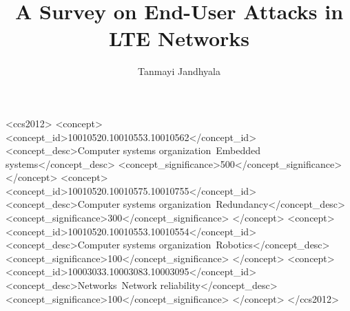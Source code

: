 \documentclass[sigconf,nonacm]{acmart}
\begin{document}
\title{A Survey on End-User Attacks in LTE Networks}


\author{Tanmayi Jandhyala}
\affiliation{%
  \institution{Master of Engineering}
  \institution{Department of Electrical and Computer Engineering} 
  \institution{University of Waterloo}
  }




\begin{CCSXML}
<ccs2012>
 <concept>
  <concept_id>10010520.10010553.10010562</concept_id>
  <concept_desc>Computer systems organization~Embedded systems</concept_desc>
  <concept_significance>500</concept_significance>
 </concept>
 <concept>
  <concept_id>10010520.10010575.10010755</concept_id>
  <concept_desc>Computer systems organization~Redundancy</concept_desc>
  <concept_significance>300</concept_significance>
 </concept>
 <concept>
  <concept_id>10010520.10010553.10010554</concept_id>
  <concept_desc>Computer systems organization~Robotics</concept_desc>
  <concept_significance>100</concept_significance>
 </concept>
 <concept>
  <concept_id>10003033.10003083.10003095</concept_id>
  <concept_desc>Networks~Network reliability</concept_desc>
  <concept_significance>100</concept_significance>
 </concept>
</ccs2012>
\end{CCSXML}
\end{document}
